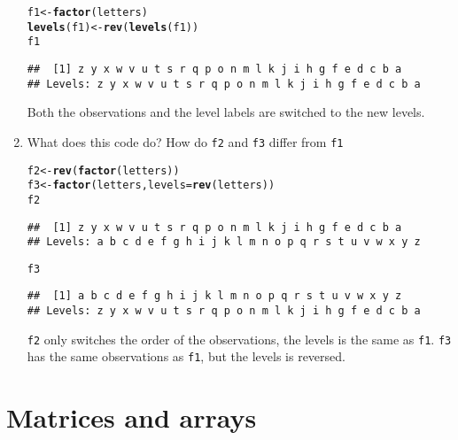 \documentclass{article}\usepackage[]{graphicx}\usepackage[]{color}
\makeatletter
\newcommand{\hlstd}[1]{\textcolor[rgb]{0.345,0.345,0.345}{#1}}%
\newcommand{\hlkwb}[1]{\textcolor[rgb]{0.69,0.353,0.396}{#1}}%
\newcommand{\hlkwc}[1]{\textcolor[rgb]{0.333,0.667,0.333}{#1}}%
\newcommand{\hlkwd}[1]{\textcolor[rgb]{0.737,0.353,0.396}{\textbf{#1}}}%
\newenvironment{kframe}{%
 \def\at@end@of@kframe{}%
 \ifinner\ifhmode%
  \def\at@end@of@kframe{\end{minipage}}%
  \begin{minipage}{\columnwidth}%
 \fi\fi%
 \def\FrameCommand##1{\hskip\@totalleftmargin \hskip-\fboxsep
 \colorbox{shadecolor}{##1}\hskip-\fboxsep
     \hskip-\linewidth \hskip-\@totalleftmargin \hskip\columnwidth}%
 \MakeFramed {\advance\hsize-\width
   \@totalleftmargin\z@ \linewidth\hsize
   \@setminipage}}%
 {\par\unskip\endMakeFramed%
 \at@end@of@kframe}
\newenvironment{knitrout}{}{} %
\makeatother
\begin{document}
\begin{enumerate}
\begin{knitrout}
\color{fgcolor}\begin{kframe}
\begin{alltt}
\hlstd{f1} \hlkwb{<-} \hlkwd{factor}\hlstd{(letters)}
\hlkwd{levels}\hlstd{(f1)} \hlkwb{<-} \hlkwd{rev}\hlstd{(}\hlkwd{levels}\hlstd{(f1))}
\hlstd{f1}
\end{alltt}
\begin{verbatim}
##  [1] z y x w v u t s r q p o n m l k j i h g f e d c b a
## Levels: z y x w v u t s r q p o n m l k j i h g f e d c b a
\end{verbatim}
\end{kframe}
\end{knitrout}

Both the observations and the level labels are switched to the new levels.

\item What does this code do? How do \verb`f2` and \verb`f3` differ from \verb`f1`

\begin{knitrout}
\color{fgcolor}\begin{kframe}
\begin{alltt}
\hlstd{f2} \hlkwb{<-} \hlkwd{rev}\hlstd{(}\hlkwd{factor}\hlstd{(letters))}
\hlstd{f3} \hlkwb{<-} \hlkwd{factor}\hlstd{(letters,} \hlkwc{levels}\hlstd{=}\hlkwd{rev}\hlstd{(letters))}
\hlstd{f2}
\end{alltt}
\begin{verbatim}
##  [1] z y x w v u t s r q p o n m l k j i h g f e d c b a
## Levels: a b c d e f g h i j k l m n o p q r s t u v w x y z
\end{verbatim}
\begin{alltt}
\hlstd{f3}
\end{alltt}
\begin{verbatim}
##  [1] a b c d e f g h i j k l m n o p q r s t u v w x y z
## Levels: z y x w v u t s r q p o n m l k j i h g f e d c b a
\end{verbatim}
\end{kframe}
\end{knitrout}

\verb`f2` only switches the order of the observations, the levels is the same as \verb`f1`. \verb`f3` has the same observations as \verb`f1`, but the levels is reversed.
\end{enumerate}

\section{Matrices and arrays}
\end{document}
